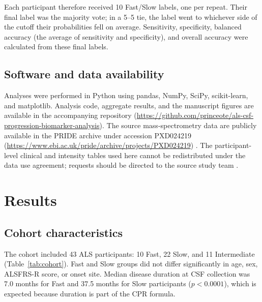 \documentclass[11pt,letterpaper]{article}
\begin{document}
Each participant therefore received 10 Fast/Slow labels, one per repeat. Their final label was the majority vote; in a 5--5 tie, the label went to whichever side of the cutoff their probabilities fell on average. Sensitivity, specificity, balanced accuracy (the average of sensitivity and specificity), and overall accuracy were calculated from these final labels.

\subsection{Software and data availability}

Analyses were performed in Python using pandas, NumPy, SciPy, scikit-learn, and matplotlib. Analysis code, aggregate results, and the manuscript figures are available in the accompanying repository (\url{https://github.com/princeote/als-csf-progression-biomarker-analysis}). The source mass-spectrometry data are publicly available in the PRIDE archive under accession PXD024219 (\url{https://www.ebi.ac.uk/pride/archive/projects/PXD024219}) \citep{perezriverol2022}. The participant-level clinical and intensity tables used here cannot be redistributed under the data use agreement; requests should be directed to the source study team \citep{thompson2021}.

\section{Results}

\subsection{Cohort characteristics}

The cohort included 43 ALS participants: 10 Fast, 22 Slow, and 11 Intermediate (Table~\ref{tab:cohort}). Fast and Slow groups did not differ significantly in age, sex, ALSFRS-R score, or onset site. Median disease duration at CSF collection was 7.0 months for Fast and 37.5 months for Slow participants ($p < 0.0001$), which is expected because duration is part of the CPR formula.
\end{document}
